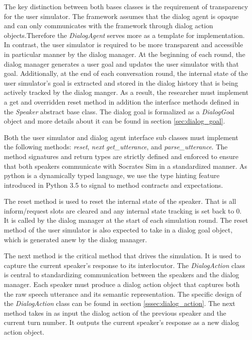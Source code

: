 The key distinction between both bases classes is the requirement of transparency for the user simulator. The framework assumes that the dialog agent is opaque and can only communicates with the framework through dialog action objects.Therefore the \textit{DialogAgent} serves more as a template for implementation.  In contrast, the user simulator is required to be more transparent and accessible in particular manner by the dialog manager. At the beginning of each round, the dialog manager generates a user goal and updates the user simulator with that goal. Additionally, at the end of each conversation round, the internal state of the user simulator's goal is extracted and stored in the dialog history that is being actively tracked by the dialog manger. As a result, the researcher must implement a get and overridden reset method in addition the interface methods defined in the \textit{Speaker} abstract base class. The dialog goal is formalized as a \textit{DialogGoa}l object and more details about it can be found in section \ref{sec:dialog_goal}. 

Both the user simulator and dialog agent interface sub classes must implement the following methods: \textit{reset}, \textit{next} \textit{get\_utterance}, and \textit{parse\_utterance}. The method signatures and return types are strictly defined and enforced to ensure that both speakers communicate with Socrates Sim in a standardized manner. As python is a dynamically typed language, we use the type hinting feature introduced in Python 3.5 to signal to method contracts and expectations. 

The reset method is used to reset the internal state of the speaker. That is all inform/request slots are cleared and any internal state tracking is set back to 0. It is called by the dialog manager at the start of each simulation round. The reset method of the user simulator is also expected to take in a dialog goal object, which is generated anew by the dialog manager. 

The next method is the critical method that drives the simulation. It is used to capture the current speaker's response to its interlocutor. The \textit{DialogAction} class is central to standardizing communication between the speakers and the dialog manager. Each speaker must produce a dialog action object that captures both the raw speech utterance and its semantic representation. The specific design of the \textit{DialogAction} class can be found in section \ref{sssec:dialog_action}. The next method takes in as input the dialog action of the previous speaker and the current turn number. It outputs the current speaker's response as a new dialog action object.

